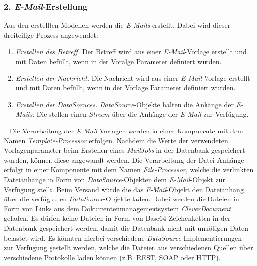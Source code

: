 \subsubsection{2. \emph{E-Mail}-Erstellung}
Aus den erstellten Modellen werden die \emph{E-Mails} erstellt. Dabei wird dieser dreiteilige Prozess angewendet:
\begin{enumerate}
	\item\emph{Erstellen des Betreff.} Der Betreff wird aus einer \emph{E-Mail}-Vorlage erstellt und mit Daten befüllt, wenn in der Voralge Parameter definiert wurden.
	\item\emph{Erstellen der Nachricht.} Die Nachricht wird aus einer \emph{E-Mail}-Vorlage erstellt und mit Daten befüllt, wenn in der Vorlage Parameter definiert wurden.
	\item\emph{Erstellen der DataSoruces.} \emph{DataSource}-Objekte halten die Anhänge der \emph{E-Mails}. Die stellen einen \emph{Stream} über die Anhänge der \emph{E-Mail} zur Verfügung.
\end{enumerate}
\ \newline
Die Verarbeitung der \emph{E-Mail}-Vorlagen werden in einer Komponente mit dem Namen \emph{Template-Processor} erfolgen. Nachdem die Werte der verwendeten Vorlagenparameter beim Erstellen eines \emph{MailJobs} in der Datenbank gespeichert wurden, können diese angewandt werden.
\newline
\newline
Die Verarbeitung der Datei Anhänge erfolgt in einer Komponente mit dem Namen \emph{File-Processor}, welche die verlinkten Dateianhänge in Form von \emph{DataSource}-Objekten dem \emph{E-Mail}-Objekt zur Verfügung stellt. Beim Versand würde die das \emph{E-Mail}-Objekt den Dateianhang über die verfügbaren \emph{DataSource}-Objekte laden. Dabei werden die Dateien in Form von Links aus dem Dokumentenmanagementsystem \emph{CleverDocument} geladen. Es dürfen keine Dateien in Form von Base64-Zeichenketten in der Datenbank gespeichert werden, damit die Datenbank nicht mit unnötigen Daten belastet wird. Es könnten hierbei verschiedene \emph{DataSource}-Implementierungen zur Verfügung gestellt werden, welche die Dateien aus verschiedenen Quellen über verschiedene Protokolle laden können (z.B. REST, SOAP oder HTTP).

